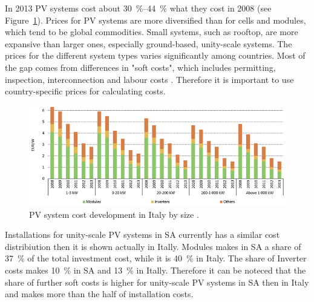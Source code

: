 In 2013 PV systems cost about \SIrange{30}{44}{\percent} what they cost in 2008 (see Figure~\ref{PVsystemCosts}). Prices for PV systems are more diversified than for cells and modules, which tend to be global commodities. Small systems, such as rooftop, are more expansive than larger ones, especially ground-based, unity-scale systems. The prices for the different system types varies significantly among countries. Most of the gap comes from differences in "soft costs", which includes permitting, inspection, interconnection and labour costs \cite{IEA2014c}. Therefore it is important to use country-specific prices for calculating costs.

\begin{figure}[htbp]  
\centering
\includegraphics[width=1\linewidth]{FIG/PVsystemCosts}
\caption[PV system cost development by size.]{PV system cost development in Italy by size \cite{IEA2014c}.}\label{PVsystemCosts}
\end{figure}
Installations for unity-scale PV systems in SA currently has a similar cost distribiution then it is shown actually in Itally. Modules makes in SA a share of \SI{37}{\percent} of the total investment cost, while it is \SI{40}{\percent} in Italy. The share of Inverter costs makes \SI{10}{\percent} in SA and \SI{13}{\percent} in Itally. Therefore it can be noteced that the share of further soft costs is higher for unity-scale PV systems in SA then in Italy and makes more than the half of installation costs. \cite{IEA2014c,Terblanche2015}
\pagebreak
